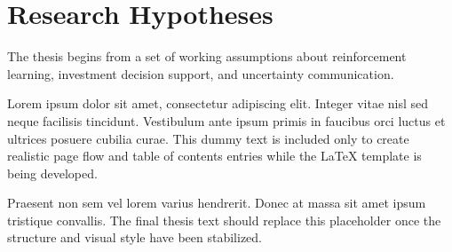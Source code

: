 \section{Research Hypotheses}

The thesis begins from a set of working assumptions about reinforcement learning, investment decision support, and uncertainty communication.

Lorem ipsum dolor sit amet, consectetur adipiscing elit. Integer vitae nisl sed neque facilisis tincidunt. Vestibulum ante ipsum primis in faucibus orci luctus et ultrices posuere cubilia curae. This dummy text is included only to create realistic page flow and table of contents entries while the LaTeX template is being developed.

Praesent non sem vel lorem varius hendrerit. Donec at massa sit amet ipsum tristique convallis. The final thesis text should replace this placeholder once the structure and visual style have been stabilized.

